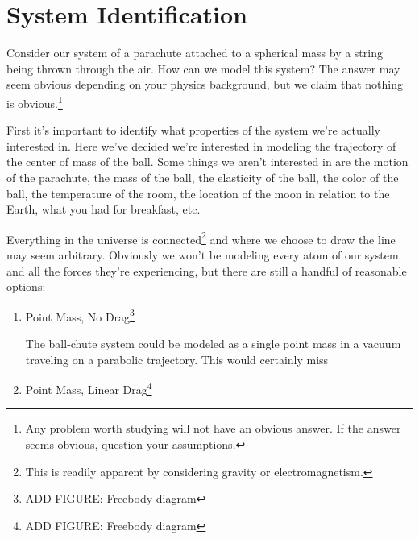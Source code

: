 \section{System Identification}

Consider our system of a parachute attached to a spherical mass by a string being thrown through the air. How can we model this system? The answer may seem obvious depending on your physics background, but we claim that nothing is obvious.\footnote{Any problem worth studying will not have an obvious answer. If the answer seems obvious, question your assumptions.}

First it's important to identify what properties of the system we're actually interested in. Here we've decided we're interested in modeling the trajectory of the center of mass of the ball. Some things we aren't interested in are the motion of the parachute, the mass of the ball, the elasticity of the ball, the color of the ball, the temperature of the room, the location of the moon in relation to the Earth, what you had for breakfast, etc. 

Everything in the universe is connected\footnote{This is readily apparent by considering gravity or electromagnetism.} and where we choose to draw the line may seem arbitrary. Obviously we won't be modeling every atom of our system and all the forces they're experiencing, but there are still a handful of reasonable options:

\begin{enumerate}
\item Point Mass, No Drag\footnote{ADD FIGURE: Freebody diagram}

The ball-chute system could be modeled as a single point mass in a vacuum traveling on a parabolic trajectory. This would certainly miss 

\item Point Mass, Linear Drag\footnote{ADD FIGURE: Freebody diagram}



\end{enumerate}

